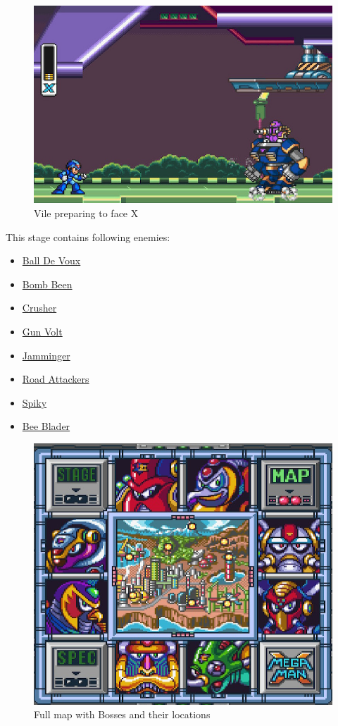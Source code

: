 \begin{figure}[htp]
	\centering
	\includegraphics[width=0.6\linewidth]{figures/X1/Highway_screenshot_3.jpg}
	\caption{Vile preparing to face X}
\end{figure}
This stage contains following enemies\cite{wiki:Highway}:
\begin{itemize}
	\item \hyperlink{enem:Ball_De_Voux}{Ball De Voux }
	\item \hyperlink{enem:Bomb_Been}{Bomb Been }
	\item \hyperlink{enem:Crusher}{Crusher }
	\item \hyperlink{enem:Gun_Volt}{Gun Volt}
	\item \hyperlink{enem:Jamminger}{Jamminger}
	\item \hyperlink{enem:Road_Attackers}{Road Attackers }
	\item \hyperlink{enem:Spiky}{Spiky }
	\item \hyperlink{miniboss:Bee_Blader}{Bee Blader }
\end{itemize}

\begin{figure}[htp]
	\centering
	\includegraphics[width=0.6\linewidth]{figures/X1/Full_map.png}
	\caption{Full map with Bosses and their locations}
\end{figure}
 
